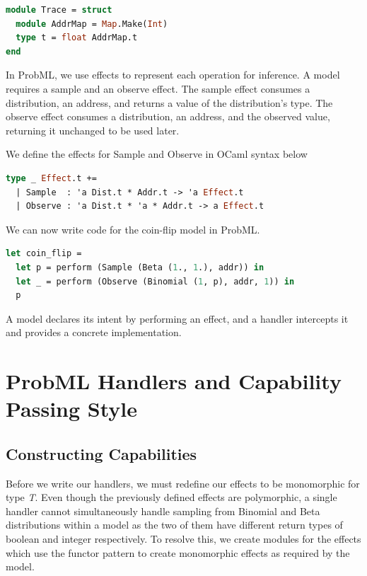\documentclass[logo,bsc,singlespacing,parskip,online]{infthesis}
\begin{document}
\begin{lstlisting}[language=OCaml]
module Trace = struct
  module AddrMap = Map.Make(Int)
  type t = float AddrMap.t
end
\end{lstlisting}

In ProbML, we use effects to represent each operation for inference. A model requires a sample and an observe effect. The sample effect consumes a distribution, an address, and returns a value of the distribution's type. The observe effect consumes a distribution, an address, and the observed value, returning it unchanged to be used later.

We define the effects for Sample and Observe in OCaml syntax below

\begin{lstlisting}[language=OCaml]
type _ Effect.t +=
  | Sample  : 'a Dist.t * Addr.t -> 'a Effect.t
  | Observe : 'a Dist.t * 'a * Addr.t -> a Effect.t
\end{lstlisting}

We can now write code for the coin-flip model in ProbML.

\begin{lstlisting}[language=OCaml]
let coin_flip =
  let p = perform (Sample (Beta (1., 1.), addr)) in
  let _ = perform (Observe (Binomial (1, p), addr, 1)) in
  p
\end{lstlisting}

A model declares its intent by performing an effect, and a handler intercepts it and provides a concrete implementation.

\section{ProbML Handlers and Capability Passing Style}

\subsection{Constructing Capabilities}

Before we write our handlers, we must redefine our effects to be monomorphic for type \textit{T}. Even though the previously defined effects are polymorphic, a single handler cannot simultaneously handle sampling from Binomial and Beta distributions within a model as the two of them have different return types of boolean and integer respectively. To resolve this, we create modules for the effects which use the functor pattern to create monomorphic effects as required by the model.
\end{document}
